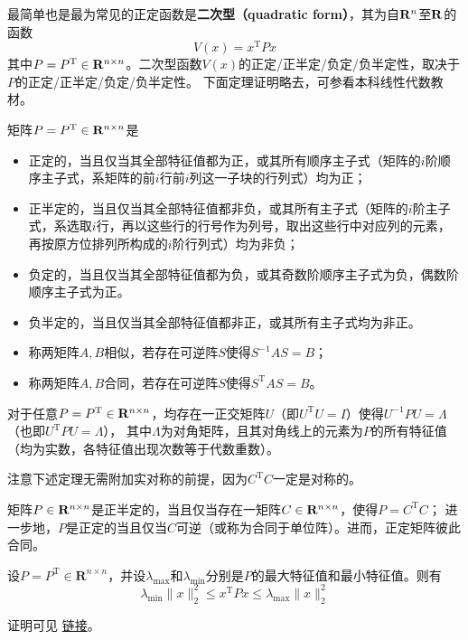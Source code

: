 最简单也是最为常见的正定函数是{\bf 二次型（quadratic form）}，其为自$\mathbf{R}{}^n$至$\mathbf{R}{}$的函数\[V(x)=x^\mathrm{T}Px\]其中$P=P^\mathrm{T}\in\mathbf{R}{}^{n\times n}$。二次型函数$V(x)$的正定/正半定/负定/负半定性，取决于$P$的正定/正半定/负定/负半定性。
下面定理证明略去，可参看本科线性代数教材。
\begin{theorem}
  矩阵$P=P^\mathrm{T}\in\mathbf{R}{}^{n\times n}$是\begin{itemize}[leftmargin=1em]
    \item 正定的，当且仅当其全部特征值都为正，或其所有顺序主子式（矩阵的$i$阶顺序主子式，系矩阵的前$i$行前$i$列这一子块的行列式）均为正；
    \item 正半定的，当且仅当其全部特征值都非负，或其所有主子式（矩阵的$i$阶主子式，系选取$i$行，再以这些行的行号作为列号，取出这些行中对应列的元素，再按原方位排列所构成的$i$阶行列式）均为非负；
    \item 负定的，当且仅当其全部特征值都为负，或其奇数阶顺序主子式为负，偶数阶顺序主子式为正。
    \item 负半定的，当且仅当其全部特征值都非正，或其所有主子式均为非正。
  \end{itemize}
\end{theorem}
\begin{definition}[相似与合同]
  \begin{itemize}[leftmargin=1em]
    \item 称两矩阵$A,B$相似，若存在可逆阵$S$使得$S^{-1}AS=B$；
    \item 称两矩阵$A,B$合同，若存在可逆阵$S$使得$S^{\mathrm{T}}AS=B$。
  \end{itemize}
\end{definition}
\begin{theorem}[实对称矩阵的正交相似对角化]
  对于任意$P=P^\mathrm{T}\in\mathbf{R}{}^{n\times n}$，均存在一正交矩阵$U$（即$U^\mathrm{T}U=I$）使得$U^{-1}PU=\Lambda$（也即$U^{\mathrm{T}}PU=\Lambda$），
  其中$\Lambda$为对角矩阵，且其对角线上的元素为$P$的所有特征值（均为实数，各特征值出现次数等于代数重数）。
\end{theorem}
注意下述定理无需附加实对称的前提，因为$C^\mathrm{T}C$一定是对称的。
\begin{theorem}[正定、正半定矩阵的分解]
  矩阵$P\in\mathbf{R}{}^{n\times n}$是正半定的，当且仅当存在一矩阵$C\in\mathbf{R}{}^{n\times n}$，使得$P=C^\mathrm{T}C$；
  进一步地，$P$是正定的当且仅当$C$可逆（或称为合同于单位阵）。进而，正定矩阵彼此合同。
\end{theorem}
\begin{theorem}\label{rayleigh-ritz}
  设$P=P^{\mathrm{T}}\in\mathbf{R}^{n\times n}$，并设$\lambda_\mathrm{max}$和$\lambda_\mathrm{min}$分别是$P$的最大特征值和最小特征值。则有
\[\lambda_{\mathrm{min}}\|x\|_{2}^{2}\le x^{\mathrm{T}}Px\le \lambda_{\mathrm{max}}\|x\|_{2}^{2}\]
\end{theorem}
证明可见 \href{https://oliverwu.top/file/rayleigh-ritz.pdf}{链接}。
